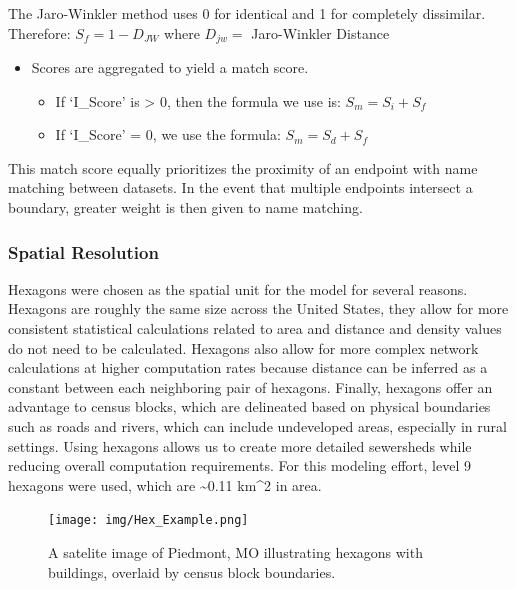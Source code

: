 \documentclass[
  letterpaper,
  DIV=11,
  numbers=noendperiod]{scrartcl}
\providecommand{\tightlist}{%
  \setlength{\itemsep}{0pt}\setlength{\parskip}{0pt}}\usepackage{longtable,booktabs,array}
\begin{document}
The Jaro-Winkler method uses 0 for identical and 1 for completely
dissimilar. Therefore: \(S_f=1-D_{JW}\) where \(D_{jw} =\) Jaro-Winkler
Distance

\begin{itemize}
\tightlist
\item
  Scores are aggregated to yield a match score.

  \begin{itemize}
  \tightlist
  \item
    If `I\_Score' is \textgreater{} 0, then the formula we use is:
    \(S_m=S_i+S_f\)
  \item
    If `I\_Score' = 0, we use the formula: \(S_m=S_d+S_f\)
  \end{itemize}
\end{itemize}

This match score equally prioritizes the proximity of an endpoint with
name matching between datasets. In the event that multiple endpoints
intersect a boundary, greater weight is then given to name matching.

\subsubsection{Spatial Resolution}\label{spatial-resolution}

Hexagons were chosen as the spatial unit for the model for several
reasons. Hexagons are roughly the same size across the United States,
they allow for more consistent statistical calculations related to area
and distance and density values do not need to be calculated. Hexagons
also allow for more complex network calculations at higher computation
rates because distance can be inferred as a constant between each
neighboring pair of hexagons. Finally, hexagons offer an advantage to
census blocks, which are delineated based on physical boundaries such as
roads and rivers, which can include undeveloped areas, especially in
rural settings. Using hexagons allows us to create more detailed
sewersheds while reducing overall computation requirements. For this
modeling effort, level 9 hexagons were used, which are
\textasciitilde0.11 km\^{}2 in area.

\begin{figure}

\texttt{[image: img/Hex\_Example.png]}

\caption{\label{fig-hex}A satelite image of Piedmont, MO illustrating
hexagons with buildings, overlaid by census block boundaries.}

\end{figure}%
\end{document}
